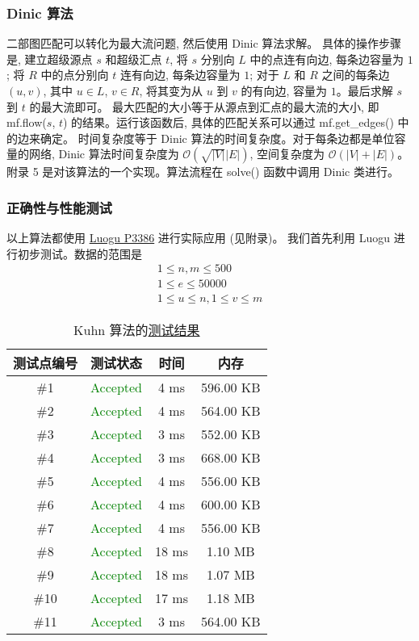 \subsubsection{Dinic 算法}
二部图匹配可以转化为最大流问题, 然后使用 Dinic 算法求解。
具体的操作步骤是, 建立超级源点 $s$ 和超级汇点 $t$, 将 $s$ 分别向 $L$ 中的点连有向边, 每条边容量为 $1$; 将 $R$ 中的点分别向 $t$ 连有向边, 每条边容量为 $1$; 对于 $L$ 和 $R$ 之间的每条边 $\left(u, v\right)$, 其中 $u \in L$, $v \in R$, 将其变为从 $u$ 到 $v$ 的有向边, 容量为 $1$。最后求解 $s$ 到 $t$ 的最大流即可。
最大匹配的大小等于从源点到汇点的最大流的大小, 即 mf.flow($s$, $t$) 的结果。运行该函数后, 具体的匹配关系可以通过 mf.get\_edges() 中的边来确定。
时间复杂度等于 Dinic 算法的时间复杂度。对于每条边都是单位容量的网络, Dinic 算法时间复杂度为 $\mathcal{O}(\sqrt{\left|V\right|}\left|E\right|)$, 空间复杂度为 $\mathcal{O}(\left|V\right| + \left|E\right|)$。
附录 5 是对该算法的一个实现。算法流程在 solve() 函数中调用 Dinic 类进行。
\subsubsection{正确性与性能测试}
以上算法都使用 \href{https://www.luogu.com.cn/problem/P3386}{Luogu P3386} 进行实际应用 (见附录)。
我们首先利用 Luogu 进行初步测试。数据的范围是
$$
\begin{gathered}
	1 \leq n, m \leq 500 \\
	1 \leq e \leq 50000 \\
	1 \leq u \leq n, 1 \leq v \leq m
\end{gathered}
$$

\begin{table}[H]
	\centering
	\caption{Kuhn 算法的\href{https://www.luogu.com.cn/record/195131973}{测试结果}}
	\label{tab:kuhn_test_results}
	\linewidth
	\begin{tabular*}{0.99\linewidth}{cccc}
		\toprule
		\textbf{测试点编号} & \textbf{测试状态} & \textbf{时间} & \textbf{内存} \\
		\midrule
		\#1 & \textcolor{green}{Accepted} & 4 ms & 596.00 KB \\
		\#2 & \textcolor{green}{Accepted} & 4 ms & 564.00 KB \\
		\#3 & \textcolor{green}{Accepted} & 3 ms & 552.00 KB \\
		\#4 & \textcolor{green}{Accepted} & 3 ms & 668.00 KB \\
		\#5 & \textcolor{green}{Accepted} & 4 ms & 556.00 KB \\
		\#6 & \textcolor{green}{Accepted} & 4 ms & 600.00 KB \\
		\#7 & \textcolor{green}{Accepted} & 4 ms & 556.00 KB \\
		\#8 & \textcolor{green}{Accepted} & 18 ms & 1.10 MB \\
		\#9 & \textcolor{green}{Accepted} & 18 ms & 1.07 MB \\
		\#10 & \textcolor{green}{Accepted} & 17 ms & 1.18 MB \\
		\#11 & \textcolor{green}{Accepted} & 3 ms & 564.00 KB \\
		\bottomrule
	\end{tabular*}
\end{table}

